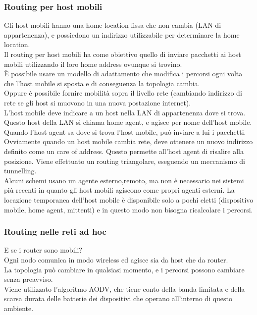 \documentclass{article}
\begin{document}
\subsubsection{Routing per host mobili}
Gli host mobili hanno una home location fissa che non cambia (LAN di appartenenza), e possiedono un indirizzo utilizzabile per determinare la home location. \\
Il routing per host mobili ha come obiettivo quello di inviare pacchetti ai host mobili utilizzando il loro home address ovunque si trovino.\\
È possibile usare un modello di adattamento che modifica i percorsi ogni volta che l'host mobile si sposta e di conseguenza la topologia cambia.\\
Oppure è possibile fornire mobilità sopra il livello rete (cambiando indirizzo di rete se gli host si muovono in una nuova postazione internet).\\
L'host mobile deve indicare a un host nella LAN di appartenenza dove si trova. Questo host della LAN si chiama home agent, e agisce per nome dell'host mobile. \\ Quando l'host agent sa dove si trova l'host mobile, può inviare a lui i pacchetti.\\
Ovviamente quando un host mobile cambia rete, deve ottenere un nuovo indirizzo definito come un care of address. Questo permette all'host agent di risalire alla posizione. Viene effettuato un routing triangolare, eseguendo un meccanismo di tunnelling.\\
Alcuni schemi usano un agente esterno,remoto, ma non è necessario nei sistemi più recenti in quanto gli host mobili agiscono come propri agenti esterni. La locazione temporanea dell'host mobile è disponibile solo a pochi eletti (dispositivo mobile, home agent, mittenti) e in questo modo non bisogna ricalcolare i percorsi.
\subsubsection{Routing nelle reti ad hoc}
E se i router sono mobili?\\
Ogni nodo comunica in modo wireless ed agisce sia da host che da router. \\
La topologia può cambiare in qualsiasi momento, e i percorsi possono cambiare senza preavviso. \\
Viene utilizzato l'algoritmo AODV, che tiene conto della banda limitata e della scarsa durata delle batterie dei dispositivi che operano all'interno di questo ambiente.
\end{document}
